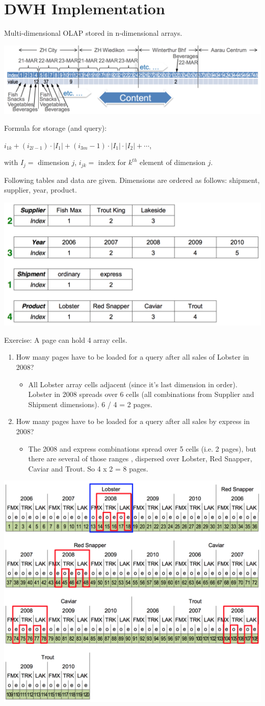 
\section{DWH Implementation}

\begin{breakbox}
\newline Multi-dimensional OLAP stored in n-dimensional arrays.
\begin{center}
\includegraphics[width=.15\textwidth]{slides_images/molap}
\end{center}
Formula for storage (and query):
\begin{center}
$i_{1k} + (i_{2l-1}) \cdot |I_1| + (i_{3m}-1) \cdot |I_1| \cdot |I_2| + \cdots$,
\end{center}
with $I_j =$ dimension $j$, $i_{jk} =$ index for $k^{th}$ element of dimension $j$.
\end{breakbox}

\begin{breakbox}
\newline Following tables and data are given. Dimensions are ordered as follows: shipment, supplier, year, product.
\begin{center}
\includegraphics[width=.15\textwidth]{slides_images/molap_example}
\end{center}
Exercise: A page can hold 4 array cells.
\begin{enumerate}[label=(\alph*)]
	\item How many pages have to be loaded for a query after all sales of Lobster in 2008?
		\begin{itemize}
			\item[] All Lobster array cells adjacent (since it's last dimension in order). Lobster in 2008 spreads over 6 cells (all combinations from Supplier and Shipment dimensions). 6 / 4 = 2 pages.
		\end{itemize}
	\item How many pages have to be loaded for a query after all sales by express in 2008?
		\begin{itemize}
			\item[] The 2008 and express combinations spread over 5 cells (i.e. 2 pages), but there are several of those ranges , dispersed over Lobster, Red Snapper, Caviar and Trout. So 4 x 2 = 8 pages.
		\end{itemize}
\end{enumerate}
\begin{center}
\includegraphics[width=.15\textwidth]{slides_images/molap_solution}
\end{center}
\end{breakbox}

